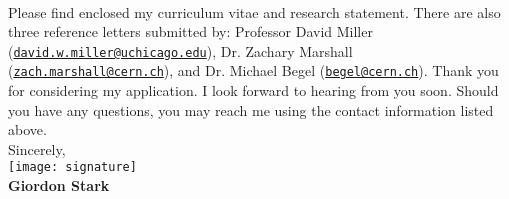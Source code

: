 \documentclass[11pt,letter]{article}
\begin{document}
\\
Please find enclosed my curriculum vitae and research statement. There are also three reference letters submitted by: Professor David Miller (\href{mailto:david.w.miller@uchicago.edu}{\nolinkurl{david.w.miller@uchicago.edu}}), Dr. Zachary Marshall (\href{mailto:zach.marshall@cern.ch}{\nolinkurl{zach.marshall@cern.ch}}), and Dr. Michael Begel (\href{mailto:begel@cern.ch}{\nolinkurl{begel@cern.ch}}). Thank you for considering my application. I look forward to hearing from you soon. Should you have any questions, you may reach me using the contact information listed above. \\

Sincerely, \\
\texttt{[image: signature]}\\
\textbf{Giordon Stark}
\end{document}

